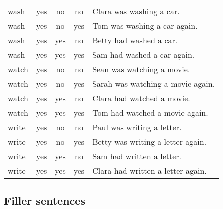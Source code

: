 \begin{longtable}{l|ccc|p{5cm}}
wash      & yes  & no   & no   & Clara was washing a car.                     \\
wash      & yes  & no   & yes  & Tom was washing a car again.                 \\
wash      & yes  & yes  & no   & Betty had washed a car.                      \\
wash      & yes  & yes  & yes  & Sam had washed a car again.                  \\
watch     & yes  & no   & no   & Sean was watching a movie.                   \\
watch     & yes  & no   & yes  & Sarah was watching a movie again.            \\
watch     & yes  & yes  & no   & Clara had watched a movie.                   \\
watch     & yes  & yes  & yes  & Tom had watched a movie again.               \\
write     & yes  & no   & no   & Paul was writing a letter.                   \\
write     & yes  & no   & yes  & Betty was writing a letter again.            \\
write     & yes  & yes  & no   & Sam had written a letter.                    \\
write     & yes  & yes  & yes  & Clara had written a letter again.  
\end{longtable}

\subsection{Filler sentences}

